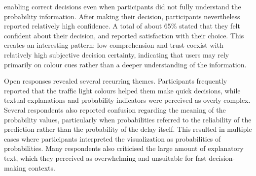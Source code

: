 \documentclass[final,journal,a4paper]{IEEEtran}
\begin{document}
enabling correct decisions even when participants did not fully understand the probability information. After making their decision, participants nevertheless reported relatively high confidence. A total of about 65\% stated that they felt confident about their decision, and reported satisfaction with their choice. This creates an interesting pattern: low comprehension and trust coexist with relatively high subjective decision certainty, indicating that users may rely primarily on colour cues rather than a deeper understanding of the information.

Open responses revealed several recurring themes. Participants frequently reported that the traffic light colours helped them make quick decisions, while textual explanations and probability indicators were perceived as overly complex. Several respondents also reported confusion regarding the meaning of the probability values, particularly when probabilities referred to the reliability of the prediction rather than the probability of the delay itself. This resulted in multiple cases where participants interpreted the visualization as probabilities of probabilities. Many respondents also criticised the large amount of explanatory text, which they perceived as overwhelming and unsuitable for fast decision-making contexts.
\end{document}
